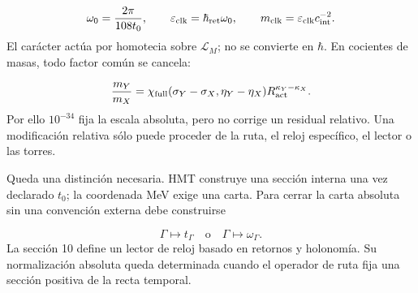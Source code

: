\[
 \omega_0=\frac{2\pi}{108t_0},\qquad
 \varepsilon_{\rm clk}=\hbar_{\rm ret}\omega_0,
 \qquad
 m_{\rm clk}=\varepsilon_{\rm clk}c_{\rm int}^{-2}.
\]
El carácter actúa por homotecia sobre \(\mathcal L_M\); no se convierte en \(\hbar\). En cocientes de masas, todo factor común se cancela:

\[
 \frac{m_Y}{m_X}
 =\chi_{\rm full}(\sigma_Y-\sigma_X,\eta_Y-\eta_X)
 R_{\rm act}^{\kappa_Y-\kappa_X}.
\]
Por ello \(10^{-34}\) fija la escala absoluta, pero no corrige un residual relativo. Una modificación relativa sólo puede proceder de la ruta, el reloj específico, el lector o las torres.

Queda una distinción necesaria. HMT construye una sección interna una vez declarado \(t_0\); la coordenada MeV exige una carta. Para cerrar la carta absoluta sin una convención externa debe construirse

\[
 \Gamma\longmapsto t_\Gamma
 \quad\text{o}\quad
 \Gamma\longmapsto\omega_\Gamma.
\]
La sección 10 define un lector de reloj basado en retornos y holonomía. Su normalización absoluta queda determinada cuando el operador de ruta fija una sección positiva de la recta temporal.

